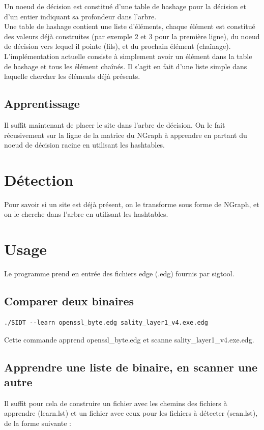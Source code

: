 \documentclass[a4paper,10pt]{article}
\begin{document}
Un noeud de décision est constitué d'une table de hashage pour la décision et d'un entier indiquant sa profondeur dans l'arbre.\\

Une table de hashage contient une liste d'éléments, chaque élément est constitué des valeurs déjà construites (par exemple 2 et 3 pour la première ligne), du noeud de décision vers lequel il pointe (fils), et du prochain élément (chaînage).\\

L'implémentation actuelle consiste à simplement avoir un élément dans la table de hashage et tous les élément chaînés. Il s'agit en fait d'une liste simple dans laquelle chercher les éléments déjà présents.

\subsection{Apprentissage}
Il suffit maintenant de placer le site dans l'arbre de décision. On le fait récusivement sur la ligne de la matrice du NGraph à apprendre en partant du noeud de décision racine en utilisant les hashtables.

\section{Détection}
Pour savoir si un site est déjà présent, on le transforme sous forme de NGraph, et on le cherche dans l'arbre en utilisant les hashtables.

\section{Usage}
Le programme prend en entrée des fichiers edge (.edg) fournis par sigtool.
\subsection{Comparer deux binaires}
\begin{verbatim}
./SIDT --learn openssl_byte.edg sality_layer1_v4.exe.edg
\end{verbatim}
Cette commande apprend openssl\_byte.edg et scanne sality\_layer1\_v4.exe.edg.

\subsection{Apprendre une liste de binaire, en scanner une autre}
Il suffit pour cela de construire un fichier avec les chemins des fichiers à apprendre (learn.lst) et un fichier avec ceux pour les fichiers à détecter (scan.lst), de la forme suivante :
\end{document}
